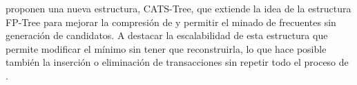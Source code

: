 \citet{CheungZaiane-IncrementalMiningOfPWithoutCandidateGenerationOrSupport-2003} proponen una nueva estructura, {CATS-Tree}, que extiende la idea de la estructura {FP-Tree} para mejorar la compresión de \D y permitir el minado de \itemsets frecuentes sin generación de candidatos. A destacar la escalabilidad de esta estructura que permite modificar el \soporte mínimo sin tener que reconstruirla, lo que hace posible también la inserción o eliminación de transacciones sin repetir todo el proceso de \ARM.

